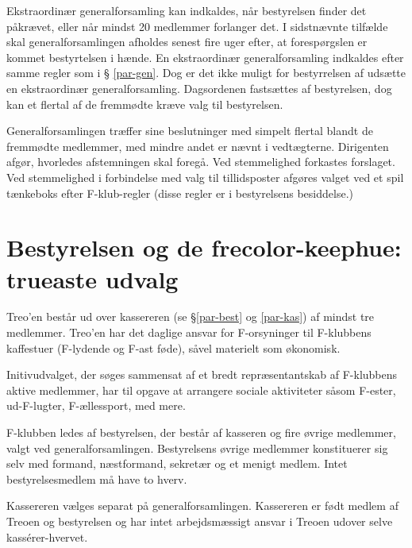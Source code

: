 \documentclass[a4paper,12pt,danish]{article}
\begin{document}
\begin{list}
\item Ekstraordinær generalforsamling kan indkaldes, når
  bestyrelsen finder det påkrævet, eller når mindst 20 medlemmer 
  forlanger det. I sidstnævnte tilfælde skal generalforsamlingen afholdes 
	senest fire uger efter, at forespørgslen er kommet bestyrtelsen i
	hænde.
  En ekstraordinær generalforsamling indkaldes efter samme regler som i \S
  \ref{par-gen}. Dog er det ikke muligt for bestyrrelsen af udsætte en ekstraordinær
  generalforsamling. Dagsordenen fastsættes af bestyrelsen, dog kan et flertal 
  af de fremmødte kræve valg til bestyrelsen. 
  
\item \label{gen-regler} Generalforsamlingen træffer sine beslutninger med 
  simpelt flertal blandt de fremmødte medlemmer, med mindre andet er nævnt i vedtægterne.
  Dirigenten afgør, hvorledes afstemningen skal foregå.
  Ved stemmelighed forkastes forslaget. 
  Ved stemmelighed i forbindelse med valg til tillidsposter afgøres valget 
  ved et spil tænkeboks efter F-klub-regler (disse regler er i bestyrelsens besiddelse.)

\section{Bestyrelsen og de frecolor-keephue: trueaste udvalg}

\item Treo'en består ud over kassereren (se \S \ref{par-best} og
  \ref{par-kas}) af mindst tre medlemmer. Treo'en har det daglige
  ansvar for F-orsyninger til F-klubbens kaffestuer (F-lydende og F-ast føde),
  såvel materielt som økonomisk.
  
\item Initivudvalget, der søges sammensat af et bredt
  repræsentantskab af F-klubbens aktive medlemmer, har til opgave at
  arrangere sociale aktiviteter såsom F-ester, ud-F-lugter,
  F-ællessport, med mere.
  
\item \label{par-best} F-klubben ledes af bestyrelsen, der består
  af kasseren og fire øvrige medlemmer, valgt ved
  generalforsamlingen.  Bestyrelsens øvrige medlemmer konstituerer sig
  selv med formand, næstformand, sekretær og et menigt medlem. Intet
  bestyrelsesmedlem må have to hverv.

\item \label{par-kas} Kassereren vælges separat på
  generalforsamlingen.  Kassereren er født medlem af Treoen og
  bestyrelsen og har intet arbejdsmæssigt ansvar i Treoen udover
  selve kass\'{e}rer-hvervet.


\end{list}
\end{document}
